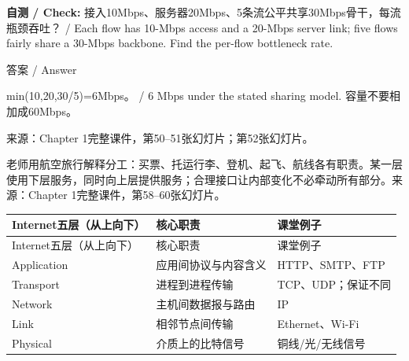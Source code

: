 

\textbf{自测 / Check:} 接入10Mbps、服务器20Mbps、5条流公平共享30Mbps骨干，每流瓶颈吞吐？ / Each flow has 10-Mbps access and a 20-Mbps server link; five flows fairly share a 30-Mbps backbone. Find the per-flow bottleneck rate.



\begin{StudySolution}{答案 / Answer}


min(10,20,30/5)=6Mbps。 / 6 Mbps under the stated sharing model. 容量不要相加成60Mbps。


\end{StudySolution}


来源：Chapter 1完整课件，第50–51张幻灯片；第52张幻灯片。








老师用航空旅行解释分工：买票、托运行李、登机、起飞、航线各有职责。某一层使用下层服务，同时向上层提供服务；合理接口让内部变化不必牵动所有部分。来源：Chapter 1完整课件，第58–60张幻灯片。


\begingroup
\small\setlength{\tabcolsep}{3pt}
\renewcommand{\arraystretch}{1.22}
\begin{longtable}{@{}>{\raggedright\arraybackslash}p{}>{\raggedright\arraybackslash}p{}>{\raggedright\arraybackslash}p{}@{}}
\toprule
Internet五层（从上向下） & 核心职责 & 课堂例子 \\
\midrule\endfirsthead
Internet五层（从上向下） & 核心职责 & 课堂例子 \\
\midrule\endhead
\bottomrule\endfoot
Application & 应用间协议与内容含义 & HTTP、SMTP、FTP \\
Transport & 进程到进程传输 & TCP、UDP；保证不同 \\
Network & 主机间数据报与路由 & IP \\
Link & 相邻节点间传输 & Ethernet、Wi-Fi \\
Physical & 介质上的比特信号 & 铜线/光/无线信号 \\
\end{longtable}
\endgroup


